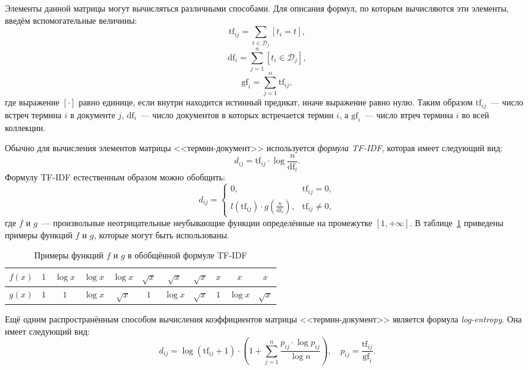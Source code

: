 Элементы данной матрицы могут вычисляться различными способами. Для описания
формул, по которым вычисляются эти элементы, введём вспомогательные величины:
\[
    \mathrm{tf}_{ij} = \sum_{t \in \mathcal{D}_j} [t_i = t],
\]
\[
    \mathrm{df}_{i} = \sum_{j=1}^{n} [t_i \in \mathcal{D}_j],
\]
\[
    \mathrm{gf}_{i} = \sum_{j=1}^{n} \mathrm{tf}_{ij},
\]
где выражение $[\cdot]$ равно единице, если внутри находится истинный
предикат, иначе выражение равно нулю. Таким образом $\mathrm{tf}_{ij}$~---
число встреч термина $i$ в документе $j$, $\mathrm{df}_{i}$~---
число документов в которых встречается термин $i$, а $\mathrm{gf}_{i}$~---
число втреч термина $i$ во всей коллекции.

Обычно для вычисления элементов матрицы <<термин-документ>> используется
\textit{формула TF-IDF}, которая имеет следующий вид:
\begin{equation}\label{eq:tf_idf}
    d_{ij} = \mathrm{tf}_{ij} \cdot \log{\frac{n}{\mathrm{df}_{i}}}.
\end{equation}
Формулу TF-IDF естественным образом можно обобщить:
\begin{equation}\label{eq:general_tfidf}
d_{ij} = \begin{cases}
    0,& \mathrm{tf}_{ij} = 0,\\
    l(\mathrm{tf}_{ij}) \cdot g(\frac{n}{\mathrm{df}_{i}}),& \mathrm{tf}_{ij} \ne 0,
         \end{cases}
\end{equation}
где $f$ и $g$~--- произвольные неотрицательные неубывающие функции определённые
на промежутке $\left[1, +\infty \right]$. В
таблице~\ref{tab:f_g_examples} приведены примеры функций $f$ и $g$,
которые могут быть использованы.

\begin{table}[!h]
    \caption{Примеры функций $f$ и $g$ в обобщённой формуле TF-IDF}\label{tab:f_g_examples}
\centering
\begin{tabular}{|c|c|c|c|c|c|c|c|c|c|c|}\hline
    \boldmath$f(x)$ & $1$ & $\log{x}$ & $\log{x}$ & $\log{x}$ & $\sqrt{x}$ & $\sqrt{x}$ & $\sqrt{x}$ & $x$ & $x$ & $x$ \\\hline
    \boldmath$g(x)$ & $1$ & $1$ & $\log{x}$ & $\sqrt{x}$ & $1$ & $\log{x}$ & $\sqrt{x}$ & $1$ & $\log{x}$ & $\sqrt{x}$ \\\hline
\end{tabular}
\end{table}

Ещё одним распространённым способом вычисления коэффициентов
матрицы <<термин-документ>> является формула \textit{log-entropy}.
Она имеет следующий вид:
\begin{equation}\label{eq:log_entropy}
    d_{ij} = \log{(\mathrm{tf}_{ij} + 1)} \cdot
    (1 + \sum_{j=1}^{n} \frac{p_{ij} \cdot \log{p_{ij}}}{\log{n}}),\quad
    p_{ij} = \frac{\mathrm{tf}_{ij}}{\mathrm{gf}_i}.
\end{equation}

